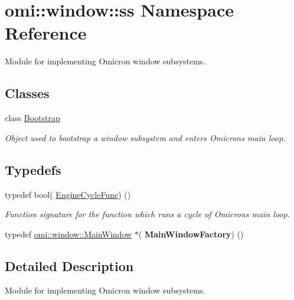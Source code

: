 \hypertarget{namespaceomi_1_1window_1_1ss}{}\section{omi\+:\+:window\+:\+:ss Namespace Reference}
\label{namespaceomi_1_1window_1_1ss}


Module for implementing Omicron window subsystems.  


\subsection*{Classes}
\begin{DoxyCompactItemize}
\item 
class \hyperlink{classomi_1_1window_1_1ss_1_1_bootstrap}{Bootstrap}
\begin{DoxyCompactList}\small\item\em Object used to bootstrap a window subsystem and enters Omicron\textquotesingle{}s main loop. \end{DoxyCompactList}\end{DoxyCompactItemize}
\subsection*{Typedefs}
\begin{DoxyCompactItemize}
\item 
typedef bool( \hyperlink{namespaceomi_1_1window_1_1ss_af42d2464a170bdfd876a35b9fde16137}{Engine\+Cycle\+Func}) ()\hypertarget{namespaceomi_1_1window_1_1ss_af42d2464a170bdfd876a35b9fde16137}{}\label{namespaceomi_1_1window_1_1ss_af42d2464a170bdfd876a35b9fde16137}

\begin{DoxyCompactList}\small\item\em Function signature for the function which runs a cycle of Omicron\textquotesingle{}s main loop. \end{DoxyCompactList}\item 
typedef \hyperlink{classomi_1_1window_1_1_main_window}{omi\+::window\+::\+Main\+Window} $\ast$( {\bfseries Main\+Window\+Factory}) ()\hypertarget{namespaceomi_1_1window_1_1ss_a978fdaf9443c677773c21a9223f09fb0}{}\label{namespaceomi_1_1window_1_1ss_a978fdaf9443c677773c21a9223f09fb0}

\end{DoxyCompactItemize}


\subsection{Detailed Description}
Module for implementing Omicron window subsystems. 